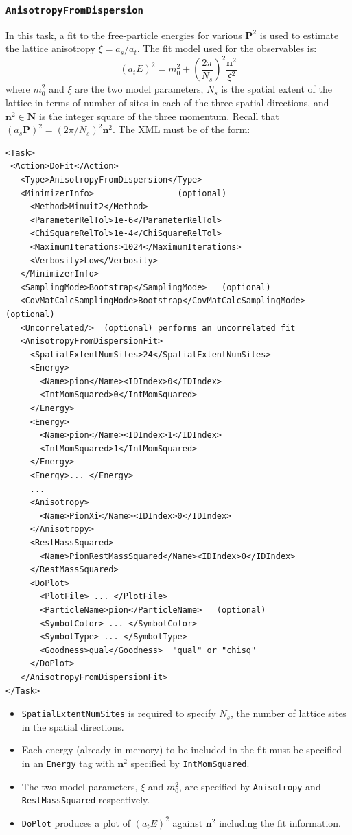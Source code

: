 \documentclass[12pt]{article}
\newcommand{\vb}{\texttt}
\begin{document}
\subsubsection{\vb{AnisotropyFromDispersion}}
In this task, a fit to the free-particle energies for various $\bm{P}^2$ is used to 
estimate the lattice
anisotropy $\xi = a_s / a_t$. The fit model used for the observables is:
\[
\left(a_t E\right)^2 = m_0^2 +  \left(\frac{2\pi}{N_s}\right)^2 \frac{\bm{n}^2}{\xi^2}
\]
where $m_0^2$ and $\xi$ are the two model parameters, $N_s$ is the spatial extent 
of the lattice in terms of number of sites in each of the three spatial directions, 
and $\bm{n}^2 \in \bm{N}$ is the integer
square of the three momentum. Recall that
$\left(a_s \bm{P}\right)^2 = \left( 2\pi / N_s \right)^2 \bm{n}^2$.
The XML must be of the form:
\begin{verbatim}
<Task>
 <Action>DoFit</Action>
   <Type>AnisotropyFromDispersion</Type>
   <MinimizerInfo>                 (optional)
     <Method>Minuit2</Method>
     <ParameterRelTol>1e-6</ParameterRelTol>
     <ChiSquareRelTol>1e-4</ChiSquareRelTol>
     <MaximumIterations>1024</MaximumIterations>
     <Verbosity>Low</Verbosity>
   </MinimizerInfo>
   <SamplingMode>Bootstrap</SamplingMode>   (optional)
   <CovMatCalcSamplingMode>Bootstrap</CovMatCalcSamplingMode> (optional)
   <Uncorrelated/>  (optional) performs an uncorrelated fit 
   <AnisotropyFromDispersionFit>
     <SpatialExtentNumSites>24</SpatialExtentNumSites>
     <Energy>
       <Name>pion</Name><IDIndex>0</IDIndex>
       <IntMomSquared>0</IntMomSquared>
     </Energy>
     <Energy>
       <Name>pion</Name><IDIndex>1</IDIndex>
       <IntMomSquared>1</IntMomSquared>
     </Energy>
     <Energy>... </Energy>
     ...
     <Anisotropy>
       <Name>PionXi</Name><IDIndex>0</IDIndex>
     </Anisotropy>
     <RestMassSquared>
       <Name>PionRestMassSquared</Name><IDIndex>0</IDIndex>
     </RestMassSquared>
     <DoPlot>
       <PlotFile> ... </PlotFile>
       <ParticleName>pion</ParticleName>   (optional)
       <SymbolColor> ... </SymbolColor>
       <SymbolType> ... </SymbolType>
       <Goodness>qual</Goodness>  "qual" or "chisq"
     </DoPlot>
   </AnisotropyFromDispersionFit>
</Task>
\end{verbatim}

\begin{itemize}
\item \vb{SpatialExtentNumSites} is required to specify $N_s$, the number of lattice sites in the
  spatial directions.
\item Each energy (already in memory) to be included in the fit must be specified in an \vb{Energy}
  tag with $\bm{n}^2$  specified by \vb{IntMomSquared}.
\item The two model parameters, $\xi$ and $m_0^2$, are specified by \vb{Anisotropy} and
\newline \vb{RestMassSquared}
  respectively.
\item \vb{DoPlot} produces a plot of $\left(a_t E\right)^2$ against $\bm{n}^2$ including the fit information.
\end{itemize}
\end{document}
